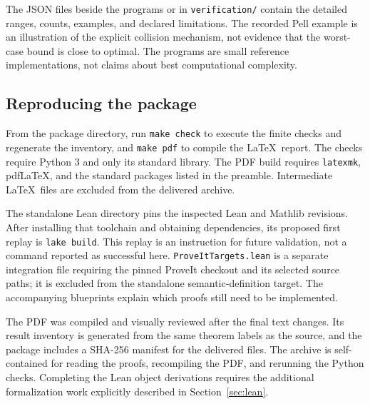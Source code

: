 The JSON files beside the programs or in \texttt{verification/} contain the detailed ranges, counts, examples, and declared limitations. The recorded Pell example is an illustration of the explicit collision mechanism, not evidence that the worst-case bound is close to optimal. The programs are small reference implementations, not claims about best computational complexity.

\subsection{Reproducing the package}
From the package directory, run \texttt{make check} to execute the finite checks and regenerate the inventory, and \texttt{make pdf} to compile the \LaTeX\ report. The checks require Python 3 and only its standard library. The PDF build requires \texttt{latexmk}, pdf\LaTeX, and the standard packages listed in the preamble. Intermediate \LaTeX\ files are excluded from the delivered archive.

The standalone Lean directory pins the inspected Lean and Mathlib revisions. After installing that toolchain and obtaining dependencies, its proposed first replay is \texttt{lake build}. This replay is an instruction for future validation, not a command reported as successful here. \texttt{ProveItTargets.lean} is a separate integration file requiring the pinned ProveIt checkout and its selected source paths; it is excluded from the standalone semantic-definition target. The accompanying blueprints explain which proofs still need to be implemented.

The PDF was compiled and visually reviewed after the final text changes. Its result inventory is generated from the same theorem labels as the source, and the package includes a SHA-256 manifest for the delivered files. The archive is self-contained for reading the proofs, recompiling the PDF, and rerunning the Python checks. Completing the Lean object derivations requires the additional formalization work explicitly described in Section~\ref{sec:lean}.
